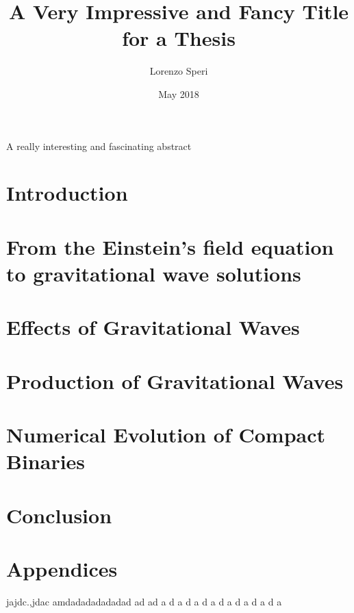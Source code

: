 \documentclass[twoside,english, a4paper, 12pt]{shared/uiofysmaster}
\author{Lorenzo Speri}
\title{\bf{A Very Impressive and Fancy Title for a Thesis}}
\date{May 2018}
\begin{document}

\maketitle
\clearpage

\tableofcontents
\clearpage

\begin{abstract1}
A really interesting and fascinating abstract
\end{abstract1}

\clearpage
\section{Introduction}


\clearpage
\section{From the Einstein's field equation\\ to gravitational wave solutions}


\clearpage
\section{Effects of Gravitational Waves}


\clearpage
\section{Production of Gravitational Waves}


\clearpage
\section{Numerical Evolution of Compact Binaries}


\clearpage
\section{Conclusion}

\clearpage
\section{Appendices}

jajdc.,jdac amdadadadadadad ad ad a  d a d a d a d a  d a d a d a





\end{document}
